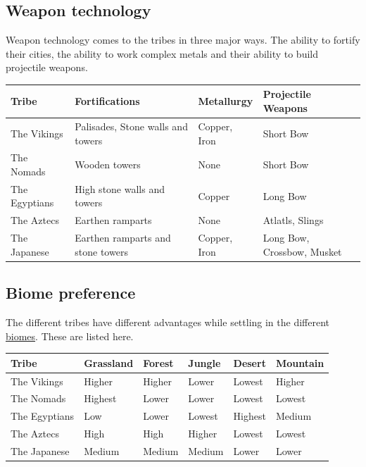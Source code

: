 \begin{landscape}
	\newpage

	\subsection{Weapon technology}
	Weapon technology comes to the tribes in three major ways. The ability to
	fortify their cities, the ability to work complex metals and their ability to
	build projectile weapons.

	\begin{longtable}{p{5cm}p{5cm}p{4cm}p{6cm}}
		\toprule
		Tribe
		 & Fortifications
		 & Metallurgy
		 & Projectile Weapons \\
		\midrule
		The \gls{Vikings}
		 & Palisades, Stone walls and towers
		 & Copper, Iron
		 & Short Bow \\
		The \gls{Nomads}
		 & Wooden towers
		 & None
		 & Short Bow \\
		The \gls{Egyptians}
		 & High stone walls and towers
		 & Copper
		 & Long Bow \\
		The \gls{Aztecs}
		 & Earthen ramparts
		 & None
		 & Atlatls, Slings \\
		The \gls{Japanese}
		 & Earthen ramparts and stone towers
		 & Copper, Iron
		 & Long Bow, Crossbow, Musket \\
		\bottomrule
	\end{longtable}

	\subsection{Biome preference}
	The different tribes have different advantages while settling in the different
	\hyperref[ch:World:Biomes]{biomes}. These are listed here.

	\begin{longtable}{llllll}
		\toprule
		Tribe
		 & \Gls*{Grassland}
		 & \Gls*{Forest}
		 & \Gls*{Jungle}
		 & \Gls*{Desert}
		 & \Gls*{Mountain} \\
		\midrule
		The \gls{Vikings}
		 & Higher
		 & Higher
		 & Lower
		 & Lowest
		 & Higher \\
		The \gls{Nomads}
		 & Highest
		 & Lower
		 & Lower
		 & Lowest
		 & Lowest \\
		The \gls{Egyptians}
		 & Low
		 & Lower
		 & Lowest
		 & Highest
		 & Medium \\
		The \gls{Aztecs}
		 & High
		 & High
		 & Higher
		 & Lowest
		 & Lowest \\
		The \gls{Japanese}
		 & Medium
		 & Medium
		 & Medium
		 & Lower
		 & Lower \\
		\bottomrule
	\end{longtable}

\end{landscape}
